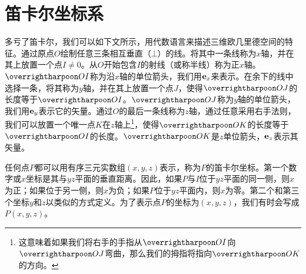 \section{笛卡尔坐标系}

多亏了笛卡尔，我们可以如下文所示，用代数语言来描述三维欧几里德空间的特征。通过原点$O$绘制任意三条相互垂直（$\bot $）的线。将其中一条线称为$x$轴，并在其上放置一个点$I\ne 0$。从$O$开始包含$I$的射线（或称半线）称为正$x$轴。$\rr{OI}$称为沿$x$轴的单位箭头，我们用$\bf{e}_x$来表示。在余下的线中选择一条，将其称为$y$轴，并在其上放置一个点$J$，使得$\rr{OJ}$的长度等于$\rr{OI}$。$\rr{OJ}$称为$y$轴的单位箭头，我们用$\bf{e}_y$表示它的矢量。通过$O$的最后一条线称为$z$轴，通过任意采用右手法则，我们可以放置一个唯一点$K$在$z$轴上\footnote{这意味着如果我们将右手的手指从$\rr{OI}$向$\rr{OJ}$弯曲，那么我们的拇指将指向$\rr{OK}$的方向。}，使得$\rr{OK}$的长度等于$\rr{OI}$的长度。$\rr{OK}$是$z$单位箭头，$\bf{e}_z$表示其矢量。

任何点$P$都可以用有序三元实数组$(x,y,z)$表示，称为$P$的笛卡尔坐标。第一个数字或$x$坐标是其与$yz$平面的垂直距离。因此，如果$P$与$I$位于$yz$平面的同一侧，则$x$为正；如果位于另一侧，则$x$为负；如果$P$位于$yz$平面内，则$x$为零。第二个和第三个坐标$y$和$z$以类似的方式定义。为了表示点$P$的坐标为$(x,y,z)$，我们有时会写成$P(x,y,z)$。

